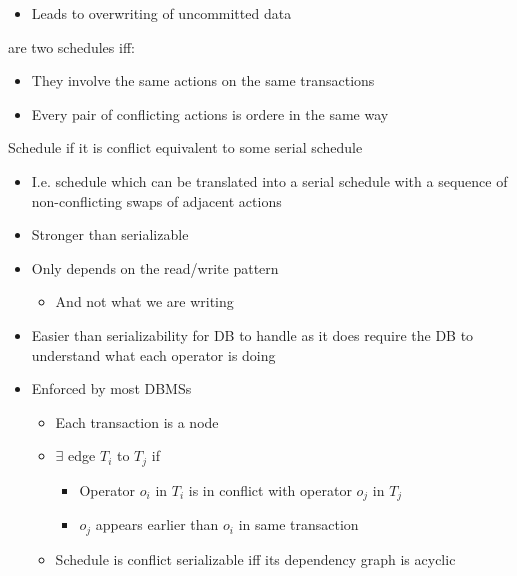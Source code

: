 \begin{itemize}
\begin{itemize}
\begin{itemize}
\begin{itemize}
                            \item Leads to overwriting of uncommitted data
                        \end{itemize}
                \end{itemize}
        \end{itemize}
     are two schedules iff:
        \begin{itemize}
            \item They involve the same actions on the same transactions
            \item Every pair of conflicting actions is ordere in the same way
        \end{itemize}
     Schedule if it is conflict equivalent to some serial schedule
        \begin{itemize}
            \item I.e. schedule which can be translated into a serial schedule with a sequence of non-conflicting swaps of adjacent actions
            \item Stronger than serializable
            \item Only depends on the read/write pattern
                \begin{itemize}
                    \item And not what we are writing
                \end{itemize}
            \item Easier than serializability for DB to handle as it does require the DB to understand what each operator is doing
            \item Enforced by most DBMSs
                \begin{itemize}
                    \item Each transaction is a node
                    \item $\exists$ edge $T_i$ to $T_j$ if
                        \begin{itemize}
                            \item Operator $o_i$ in $T_i$ is in conflict with operator $o_j$ in $T_j$
                            \item $o_j$ appears earlier than $o_i$ in same transaction
                        \end{itemize}
                    \item Schedule is conflict serializable iff its dependency graph is acyclic
                \end{itemize}

\end{itemize}
\end{itemize}
